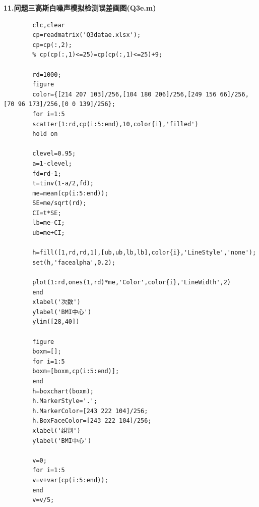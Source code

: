 \documentclass[12pt]{ctexart}
\begin{document}
	\noindent \textbf{\heiti 11.问题三高斯白噪声模拟检测误差画图(Q3e.m)}
	\begin{verbatim}
		clc,clear
		cp=readmatrix('Q3datae.xlsx');
		cp=cp(:,2);
		% cp(cp(:,1)<=25)=cp(cp(:,1)<=25)+9;
		
		rd=1000;
		figure
		color={[214 207 103]/256,[104 180 206]/256,[249 156 66]/256,[70 96 173]/256,[0 0 139]/256};
		for i=1:5
		scatter(1:rd,cp(i:5:end),10,color{i},'filled')
		hold on
		
		clevel=0.95;
		a=1-clevel;
		fd=rd-1;
		t=tinv(1-a/2,fd);
		me=mean(cp(i:5:end));
		SE=me/sqrt(rd);
		CI=t*SE;
		lb=me-CI;
		ub=me+CI;
		
		h=fill([1,rd,rd,1],[ub,ub,lb,lb],color{i},'LineStyle','none');
		set(h,'facealpha',0.2);
		
		plot(1:rd,ones(1,rd)*me,'Color',color{i},'LineWidth',2)
		end
		xlabel('次数')
		ylabel('BMI中心')
		ylim([28,40])
		
		figure
		boxm=[];
		for i=1:5
		boxm=[boxm,cp(i:5:end)];
		end
		h=boxchart(boxm);
		h.MarkerStyle='.';
		h.MarkerColor=[243 222 104]/256;
		h.BoxFaceColor=[243 222 104]/256;
		xlabel('组别')
		ylabel('BMI中心')
		
		v=0;
		for i=1:5
		v=v+var(cp(i:5:end));
		end
		v=v/5;
	\end{verbatim}
	
\end{document}
